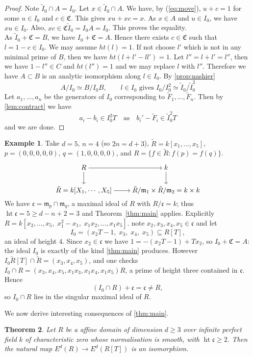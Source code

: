 \documentclass[11pt,reqno]{amsart}
\theoremstyle{plain}
\newtheorem{theorem}{Theorem}[section]
\theoremstyle{definition}
\newtheorem{example}[theorem]{Example}
\newcommand{\hgt}{\operatorname{ht}}
\newcommand{\Rt}{\widetilde{R}}
\newcommand{\It}{\widetilde{I}}
\newcommand{\cc}{\mathfrak{c}}
\newcommand{\CC}{\mathfrak{C}}
\newcommand{\mm}{\mathfrak{m}}
\begin{document}
\begin{proof}
Note $\It_0\cap A=I_0$.  Let $x\in \It_0\cap A$. We have, by (\ref{eq:move}), $u+c=1$ for some $u\in I_0$ and $c\in \CC$. This gives $xu+xc=x$. As $x\in A$ and $u\in I_0$, we have $xu\in I_0$. Also, $xc\in \CC \It_0= I_0A=I_0.$ This proves the equality.\\
 As $\It_0+\CC=B$, we have $I_0+\CC=A$. Hence there exists $c\in \CC$ such that $l=1-c\in I_0$. We may assume $ht(l)=1$. If not choose $l'$ which is not in any minimal prime of $B$, then we have $ht(l+l'-ll')=1$. Let $l''=l+l'=l''$, then we have $1-l''\in C$ and $ht(l'')=1$ and we may replace $l$ with $l''$. Therefore we have $A\subset B$ is an analytic isomorphism along $l\in I_0$. By \ref{prop:nashier}
\begin{equation}
    A/I_0\simeq B/I_0B,
     \qquad l\in I_0\text{ gives } I_0/I_0^2\simeq \It_0/\It_0^2
\end{equation}
Let $a_1,\ldots, a_n$ be the generators of $I_0$ corresponding to $\widetilde F_1,\ldots,\widetilde F_n$. Then by \ref{lem:contract} we have \begin{equation}
    a_i-b_i\in I_0^2T \quad  \text{as}\quad b_i'-\widetilde F_i \in \It_0^2T
\end{equation}
and we are done.


\end{proof}
\begin{example}\label{ex:hyperbola}
Take $d=5$, $n=4$ (so $2n=d+3$), $\Rt=k[x_1,\dots,x_5]$, $p=(0,0,0,0,0)$,
$q=(1,0,0,0,0)$, and $R=\{f\in\Rt: f(p)=f(q)\}$.

 \[\begin{tikzcd}[ampersand replacement=\&,cramped]
	R \& k \\
	{\tilde{R}=k[X_1,\cdots,X_5]} \& {\tilde{R}/\mathfrak{m}_1\times\tilde{R}/\mathfrak{m}_2=k\times k}
	\arrow[from=1-1, to=1-2]
	\arrow[from=1-1, to=2-1]
	\arrow[from=1-2, to=2-2]
	\arrow[from=2-1, to=2-2]
\end{tikzcd}\]    
We have $\cc=\mm_p\cap\mm_q$, a maximal ideal of $R$ with
$R/\cc=k$; thus $\hgt\cc=5\ge d-n+2=3$ and Theorem~\ref{thm:main} applies. Explicitly
$R=k[x_2,\dots,x_5,\;x_1^2-x_1,\;x_1x_2,\dots,x_1x_5]$.  note $x_2,x_3,x_4,x_5\in\cc$ and let
\[
I_0=(x_2T-1,\;x_3,\;x_4,\;x_5)\subseteq R[T],
\]
an ideal of height $4$. Since $x_2\in\cc$ we have $1=-(x_2T-1)+T x_2$, so $I_0+\CC=A$:
the ideal $I_0$ is exactly of the kind \ref{thm:main} produces. However
$I_0\Rt[T]\cap\Rt=(x_3,x_4,x_5)$, and one checks $I_0\cap
R=(x_3,x_4,x_5,x_1x_3,x_1x_4,x_1x_5)R$, a prime of height three contained in $\cc$. Hence
\[
(I_0\cap R)+\cc=\cc\ne R,
\]
so $I_0\cap R$ lies in the singular maximal ideal of $R$.
\end{example}
We now derive interesting consequences of \ref{thm:main}.
\begin{theorem}\label{thm:euler}
    Let $R$ be a affine domain of dimension $d\ge3$  over infinite perfect field $k$ of characteristic zero whose normalisation is smooth, with $\hgt\cc\ge 2$. Then the natural map $E^d(R)\xrightarrow[]{}E^d(R[T])$ is an isomorphism.
\end{theorem}
\end{document}
